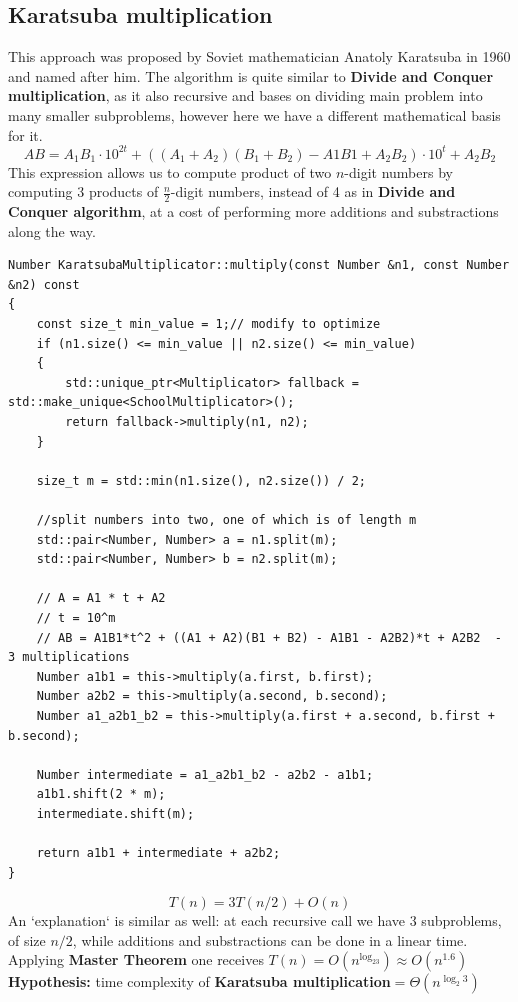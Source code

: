 \documentclass[12pt, oneside]{article}
\newenvironment{code}{\captionsetup{type=listing}}{}
\begin{document}
  \subsection {Karatsuba multiplication}
  
  This approach was proposed by Soviet mathematician Anatoly Karatsuba in 1960 and named after him. The algorithm is quite similar to \textbf{Divide and Conquer multiplication}, as it also recursive and bases on dividing main problem into many smaller subproblems, however here we have a different mathematical basis for it.
  \[A B =  A_1B_1  \cdot 10^{2t} + ((A_1 + A_2)(B_1 + B_2) - A1B1 + A_2B_2)\cdot 10^t + A_2B_2 \] 
  This expression allows us to compute product of two $n$-digit numbers by computing 3 products of $\frac{n}{2}$-digit numbers, instead of 4 as in \textbf{Divide and Conquer algorithm}, at a cost of performing more additions and substractions along the way.
    \begin{code}

  \begin{verbatim}
Number KaratsubaMultiplicator::multiply(const Number &n1, const Number &n2) const
{
    const size_t min_value = 1;// modify to optimize
    if (n1.size() <= min_value || n2.size() <= min_value)
    {
        std::unique_ptr<Multiplicator> fallback = std::make_unique<SchoolMultiplicator>();
        return fallback->multiply(n1, n2);
    }

    size_t m = std::min(n1.size(), n2.size()) / 2;

    //split numbers into two, one of which is of length m
    std::pair<Number, Number> a = n1.split(m);
    std::pair<Number, Number> b = n2.split(m);

    // A = A1 * t + A2
    // t = 10^m
    // AB = A1B1*t^2 + ((A1 + A2)(B1 + B2) - A1B1 - A2B2)*t + A2B2  - 3 multiplications
    Number a1b1 = this->multiply(a.first, b.first);
    Number a2b2 = this->multiply(a.second, b.second);
    Number a1_a2b1_b2 = this->multiply(a.first + a.second, b.first + b.second);

    Number intermediate = a1_a2b1_b2 - a2b2 - a1b1;
    a1b1.shift(2 * m);
    intermediate.shift(m);

    return a1b1 + intermediate + a2b2;
}
  \end{verbatim}
  \end{code}
  \[T(n) = 3T(n/2) + O(n)\]
   An `explanation` is similar as well: at each recursive call we have 3 subproblems, of size $n/2$, while additions and substractions can be done in a linear time. Applying \textbf{Master Theorem} one receives $T(n) = O(n^{\log_23}) \approx O(n^{1.6})$
    \vspace{0.3cm}
\\ \textbf{Hypothesis:} time complexity of  \textbf{Karatsuba multiplication}$ =  \Theta(n^{\log_2 3})$
\end{document}
